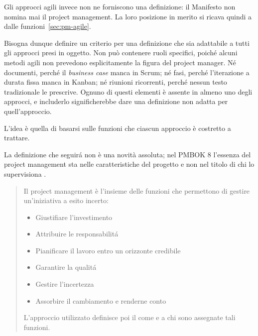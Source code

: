 Gli approcci agili invece non ne forniscono una
definizione: il Manifesto non nomina mai il project management. La loro
posizione in merito si ricava quindi a dalle funzioni~\ref{sec:pm-agile}.

Bisogna dunque definire un criterio per una definizione che sia adattabile a tutti
gli approcci presi in oggetto. Non pu\`o contenere ruoli specifici,
poich\'e alcuni metodi agili non prevedono esplicitamente la figura del project manager.
N\'e documenti, perch\'e il \emph{business case} manca in Scrum;
n\'e fasi, perch\'e l'iterazione a durata fissa manca in Kanban; n\'e riunioni
ricorrenti, perch\'e nessun testo tradizionale le prescrive. Ognuno di questi
elementi \`e assente in almeno uno degli approcci, e includerlo significherebbe
dare una definizione non adatta per quell'approccio.

L'idea \`e quella di basarsi sulle funzioni che ciascun approccio \`e costretto a
trattare.

La definizione che seguir\'a non \`e una novit\`a assoluta; nel PMBOK 8 l'essenza del
project management sta nelle caratteristiche del progetto e non
nel titolo di chi lo supervisiona \cite{pmbok8}.

\begin{quote}
Il project management \`e l'insieme delle funzioni che permettono di gestire
un'iniziativa a esito incerto:
\begin{itemize}
    \item Giustifiare l'investimento
    \item Attribuire le responsabilit\'a
    \item Pianificare il lavoro entro un orizzonte credibile
    \item Garantire la qualit\'a
    \item Gestire l'incertezza
    \item Assorbire il cambiamento e renderne conto
\end{itemize}

L'approccio utilizzato definisce poi il come e a chi sono assegnate tali
funzioni.
\end{quote}

